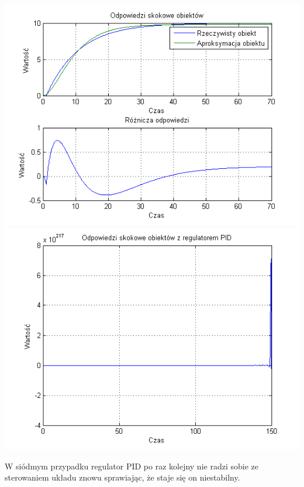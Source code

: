 \documentclass[10pt,a4paper]{article}
\begin{document}
\begin{center}
\includegraphics[scale=1]{images/dwa/skrypt_223.png}\\
\includegraphics[scale=1]{images/dwa/skrypt_224.png}\\
\end{center}
\newpage
W siódmym przypadku regulator PID po raz kolejny nie radzi sobie ze sterowaniem układu znowu sprawiając, że staje się on niestabilny.
\newpage
\end{document}
